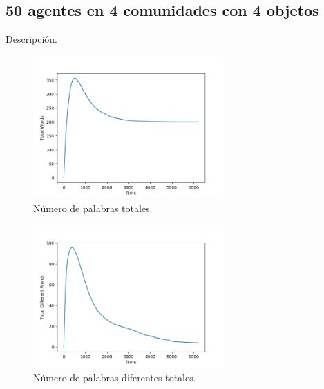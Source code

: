 \documentclass[runningheads]{llncs}
\begin{document}
\subsection{50 agentes en 4 comunidades con 4 objetos}
Descripción.
\begin{figure}[h]
	\centering
	\includegraphics[width=0.65\textwidth]{Figure_111_TotalWords.png}
	\caption{Número de palabras totales.}
	\label{fig_000}
\end{figure}
\begin{figure}[h]
	\centering
	\includegraphics[width=0.65\textwidth]{Figure_111_TotalDifferentWords.png}
	\caption{Número de palabras diferentes totales.}
	\label{fig_001}
\end{figure}
\pagebreak
\\
\end{document}
